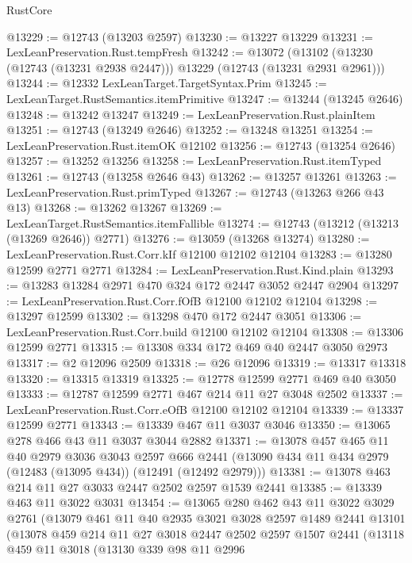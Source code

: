 \begin{lexlean}{RustCore}
\begin{coremodule}
@13229 := @12743 (@13203 @2597)
@13230 := @13227 @13229
@13231 := LexLeanPreservation.Rust.tempFresh
@13242 := @13072
    (@13102 (@13230 (@12743 (@13231 @2938 @2447))) @13229 (@12743 (@13231 @2931 @2961)))
@13244 := @12332 LexLeanTarget.TargetSyntax.Prim
@13245 := LexLeanTarget.RustSemantics.itemPrimitive
@13247 := @13244 (@13245 @2646)
@13248 := @13242 @13247
@13249 := LexLeanPreservation.Rust.plainItem
@13251 := @12743 (@13249 @2646)
@13252 := @13248 @13251
@13254 := LexLeanPreservation.Rust.itemOK @12102
@13256 := @12743 (@13254 @2646)
@13257 := @13252 @13256
@13258 := LexLeanPreservation.Rust.itemTyped
@13261 := @12743 (@13258 @2646 @43)
@13262 := @13257 @13261
@13263 := LexLeanPreservation.Rust.primTyped
@13267 := @12743 (@13263 @266 @43 @13)
@13268 := @13262 @13267
@13269 := LexLeanTarget.RustSemantics.itemFallible
@13274 := @12743 (@13212 (@13213 (@13269 @2646)) @2771)
@13276 := @13059 (@13268 @13274)
@13280 := LexLeanPreservation.Rust.Corr.kIf @12100 @12102 @12104
@13283 := @13280 @12599 @2771 @2771
@13284 := LexLeanPreservation.Rust.Kind.plain
@13293 := @13283 @13284 @2971 @470 @324 @172 @2447 @3052 @2447 @2904
@13297 := LexLeanPreservation.Rust.Corr.fOfB @12100 @12102 @12104
@13298 := @13297 @12599
@13302 := @13298 @470 @172 @2447 @3051
@13306 := LexLeanPreservation.Rust.Corr.build @12100 @12102 @12104
@13308 := @13306 @12599 @2771
@13315 := @13308 @334 @172 @469 @40 @2447 @3050 @2973
@13317 := @2 @12096 @2509
@13318 := @26 @12096
@13319 := @13317 @13318
@13320 := @13315 @13319
@13325 := @12778 @12599 @2771 @469 @40 @3050
@13333 := @12787 @12599 @2771 @467 @214 @11 @27 @3048 @2502
@13337 := LexLeanPreservation.Rust.Corr.eOfB @12100 @12102 @12104
@13339 := @13337 @12599 @2771
@13343 := @13339 @467 @11 @3037 @3046
@13350 := @13065 @278 @466 @43 @11 @3037 @3044 @2882
@13371 := @13078
    @457
    @465
    @11
    @40
    @2979
    @3036
    @3043
    @2597
    @666
    @2441
    (@13090 @434 @11 @434 @2979 (@12483 (@13095 @434)) (@12491 (@12492 @2979)))
@13381 := @13078 @463 @214 @11 @27 @3033 @2447 @2502 @2597 @1539 @2441
@13385 := @13339 @463 @11 @3022 @3031
@13454 := @13065
    @280
    @462
    @43
    @11
    @3022
    @3029
    @2761
    (@13079
      @461
      @11
      @40
      @2935
      @3021
      @3028
      @2597
      @1489
      @2441
      @13101
      (@13078
        @459
        @214
        @11
        @27
        @3018
        @2447
        @2502
        @2597
        @1507
        @2441
        (@13118
          @459
          @11
          @3018
          (@13130
            @339
            @98
            @11
            @2996

\end{coremodule}
\end{lexlean}
